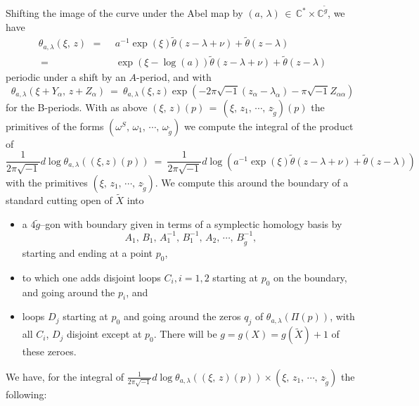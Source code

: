 \documentclass[12pt,reqno]{amsart}
\numberwithin{equation}{section}
\theoremstyle{definition}
\theoremstyle{remark}
\def\bC{{\mathbb {C}}}
\begin{document}
Shifting the image of the curve under the Abel map by $(a,\, \lambda) \,\in\, \bC^*\times \bC^{\widetilde g}$,  
we have 
\begin{align*}\theta_{a,\lambda}(\xi,\, z)\,\ =\,\ & a^{-1} \exp (\xi )\widetilde{\theta}(z-\lambda+\nu)+\widetilde{\theta} (z-\lambda )\\
\ =\ &\exp ({\xi -\log(a)})\widetilde{\theta}(z-\lambda+\nu)+ \widetilde{\theta} (z-\lambda )
\end{align*}
periodic under a shift by an $A$-period, and with 
\begin{equation}\label{B-shift} \theta_{a,\lambda}(\xi +Y_\alpha,\, z + Z_\alpha)\ =\  \theta_{a,\lambda}(\xi  , z )
\exp (-2\pi\sqrt{-1} (z_\alpha -\lambda_\alpha) -\pi\sqrt{-1} Z_{\alpha\alpha})\end{equation}
for the B-periods. With as above $(\xi,\, z)(p)\,=\, (\xi,\, z_1,\, \cdots ,\,z_{\widetilde g})(p)$ the
primitives   of the forms $(\omega^S,\, \omega_1,\,
\cdots ,\,\omega_{\widetilde g})$ we  compute the integral of the product of
$$\frac{1}{2\pi\sqrt{-1}}d\log \theta_{a,\lambda}((\xi, z)(p))\ =\ \frac{1}{2\pi\sqrt{-1}}d\log
\left(  a^{-1}\exp({ \xi}) \widetilde \theta( z -\lambda+ \nu)+ \widetilde{\theta} (z-\lambda )\right)$$
with the primitives $ (\xi,\, z_1,\,\cdots ,\, z_{\widetilde g})$. We compute this around the boundary
of a standard cutting open of $\widetilde X$ into
\begin{itemize} 
\item a $4\widetilde g$--gon with boundary given in terms of a symplectic homology basis  by $$A_1,\,B_1,\,
A_1^{-1},\, B_1^{-1},\, A_2,\, \cdots ,\, B_{\widetilde g}^{-1},$$ starting and ending at a point $p_0$, 

\item to  which one adds disjoint loops $C_i, i=1, 2$ starting at $p_0$ on the boundary, and going around the $p_i$, and 

\item  loops $D_j$ starting at $p_0$ and going around the zeros $q_j$ of $\theta_{a,\lambda}(\Pi(p))$,
with all $C_i$, $D_j$ disjoint except at $p_0$. There will be $g = g(X) = g(\widetilde X) +1$ of these zeroes.
 \end{itemize}
  We have, for the integral of $\frac{1}{2\pi\sqrt{-1}} d\log \theta_{a,\lambda}((\xi,\,z)(p))\times
(\xi,\, z_1,\,\cdots ,\,z_{\widetilde g})$ the following:
\end{document}
